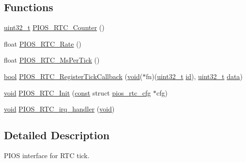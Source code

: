 \subsection*{Functions}
\begin{DoxyCompactItemize}
\item 
\hyperlink{stdint_8h_a435d1572bf3f880d55459d9805097f62}{uint32\-\_\-t} \hyperlink{group___p_i_o_s___r_t_c_ga9d01d1ac8ca6944639f49eeb358a5283}{P\-I\-O\-S\-\_\-\-R\-T\-C\-\_\-\-Counter} ()
\item 
float \hyperlink{group___p_i_o_s___r_t_c_ga67f1e1979b94ff871968e14497974af1}{P\-I\-O\-S\-\_\-\-R\-T\-C\-\_\-\-Rate} ()
\item 
float \hyperlink{group___p_i_o_s___r_t_c_gad34cae8cd02b5e6de39366292722edba}{P\-I\-O\-S\-\_\-\-R\-T\-C\-\_\-\-Ms\-Per\-Tick} ()
\item 
\hyperlink{group___exported__types_gaf6a258d8f3ee5206d682d799316314b1}{bool} \hyperlink{group___p_i_o_s___r_t_c_gaedab634636153fb8507f2fd1667c6f39}{P\-I\-O\-S\-\_\-\-R\-T\-C\-\_\-\-Register\-Tick\-Callback} (\hyperlink{group___n_a_m_e_ga18028b8badbf1ea7e704ccac3c488e82}{void}($\ast$fn)(\hyperlink{stdint_8h_a435d1572bf3f880d55459d9805097f62}{uint32\-\_\-t} \hyperlink{group___u_a_v_gabaabdc509cdaba7df9f56c6c76f3ae19}{id}), \hyperlink{stdint_8h_a435d1572bf3f880d55459d9805097f62}{uint32\-\_\-t} \hyperlink{pios__opahrs__proto_8h_a20e3f4bfaeccf09a75ef27e095a10112}{data})
\item 
\hyperlink{group___n_a_m_e_ga18028b8badbf1ea7e704ccac3c488e82}{void} \hyperlink{group___p_i_o_s___r_t_c_ga0edcdea74daf967c3ebbf09d14f21f95}{P\-I\-O\-S\-\_\-\-R\-T\-C\-\_\-\-Init} (\hyperlink{group___n_a_m_e_ga7ae6d0e43244213b34de2c2b9aa30da6}{const} struct \hyperlink{structpios__rtc__cfg}{pios\-\_\-rtc\-\_\-cfg} $\ast$cfg)
\item 
\hyperlink{group___n_a_m_e_ga18028b8badbf1ea7e704ccac3c488e82}{void} \hyperlink{group___p_i_o_s___r_t_c_ga882b48b1e7ce218715dbcc6268387eb7}{P\-I\-O\-S\-\_\-\-R\-T\-C\-\_\-irq\-\_\-handler} (\hyperlink{group___n_a_m_e_ga18028b8badbf1ea7e704ccac3c488e82}{void})
\end{DoxyCompactItemize}


\subsection{Detailed Description}
P\-I\-O\-S interface for R\-T\-C tick. 

